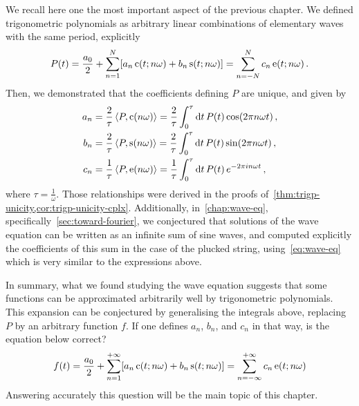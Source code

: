 We recall here one the most important aspect of the previous chapter. We defined
trigonometric polynomials as arbitrary linear combinations of elementary waves with the
same period, explicitly
\begin{equation}
  P(t)=\frac{a_0}{2}+\sum_{n=1}^N[a_n\operatorname{c}(t;n\omega)+b_n\operatorname{s}(t;n\omega)]=
  \sum_{n=-N}^{N}c_n\operatorname{e}(t;n\omega)\,.
\end{equation}
Then, we demonstrated that the coefficients defining $P$ are unique, and given by
\begin{align}
  a_n&=\frac{2}{\tau}\braket{P,\operatorname{c}(n\omega)}
  =\frac{2}{\tau}\int_0^{\tau}\mathrm{d} t\,P(t)\cos(2\pi n\omega t)\,,
  \label{eq:series-an-intro}\\
  b_n&=\frac{2}{\tau}\braket{P,\operatorname{s}(n\omega)}
  =\frac{2}{\tau}\int_0^{\tau}\mathrm{d} t\,P(t)\sin(2\pi n\omega t)\,,
  \label{eq:series-bn-intro}\\
  c_n&=\frac{1}{\tau}\braket{P,\operatorname{e}(n\omega)}
  =\frac{1}{\tau}\int_0^{\tau}\mathrm{d} t\,P(t)\,e^{-2\pi i n\omega t}\,,
  \label{eq:series-cn-intro}
\end{align}
where $\tau=\frac{1}{\omega}$. Those relationships were derived in the proofs
of~\cref{thm:trigp-unicity,cor:trigp-unicity-cplx}. Additionally, in~\cref{chap:wave-eq},
specifically~\cref{sec:toward-fourier}, we conjectured that solutions of the wave equation
can be written as an infinite sum of sine waves, and computed explicitly the coefficients
of this sum in the case of the plucked string, using~\cref{eq:wave-eq} which is very
similar to the expressions above.

In summary, what we found studying the wave equation suggests that some functions can be
approximated arbitrarily well by trigonometric polynomials. This expansion can be
conjectured by generalising the integrals above, replacing $P$ by an arbitrary function
$f$. If one defines $a_n$, $b_n$, and $c_n$ in that way, is the equation below correct?
\begin{equation}
  f(t)=\frac{a_0}{2}+\sum_{n=1}^{+\infty}[a_n\operatorname{c}(t;n\omega)+b_n\operatorname{s}(t;n\omega)]=
  \sum_{n=-\infty}^{+\infty}c_n\operatorname{e}(t;n\omega)
\end{equation}
Answering accurately this question will be the main topic of this chapter.
